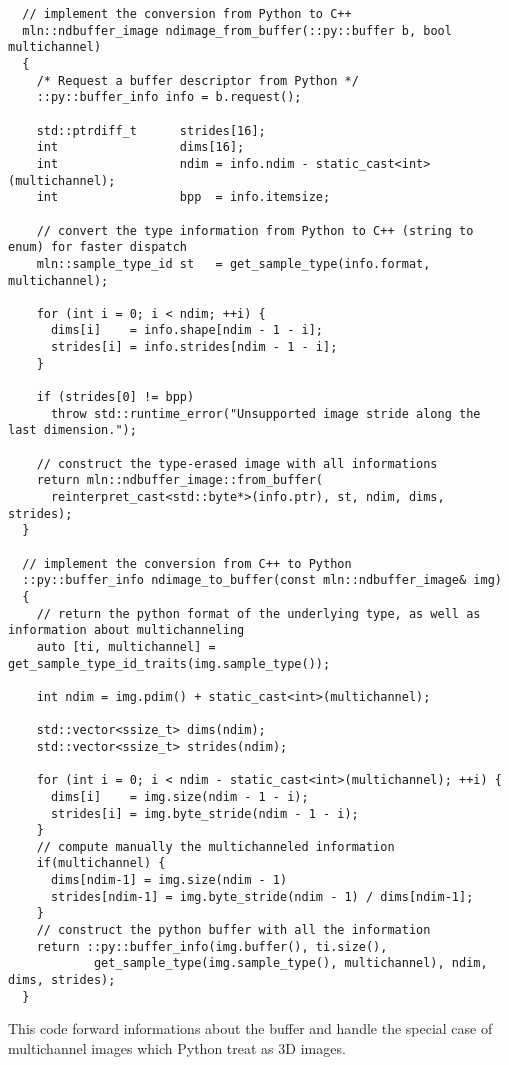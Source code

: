 \begin{verbatim}
  // implement the conversion from Python to C++
  mln::ndbuffer_image ndimage_from_buffer(::py::buffer b, bool multichannel)
  {
    /* Request a buffer descriptor from Python */
    ::py::buffer_info info = b.request();

    std::ptrdiff_t      strides[16];
    int                 dims[16];
    int                 ndim = info.ndim - static_cast<int>(multichannel);
    int                 bpp  = info.itemsize;

    // convert the type information from Python to C++ (string to enum) for faster dispatch
    mln::sample_type_id st   = get_sample_type(info.format, multichannel);

    for (int i = 0; i < ndim; ++i) {
      dims[i]    = info.shape[ndim - 1 - i];
      strides[i] = info.strides[ndim - 1 - i];
    }

    if (strides[0] != bpp)
      throw std::runtime_error("Unsupported image stride along the last dimension.");

    // construct the type-erased image with all informations
    return mln::ndbuffer_image::from_buffer(
      reinterpret_cast<std::byte*>(info.ptr), st, ndim, dims, strides);
  }

  // implement the conversion from C++ to Python
  ::py::buffer_info ndimage_to_buffer(const mln::ndbuffer_image& img)
  {
    // return the python format of the underlying type, as well as information about multichanneling
    auto [ti, multichannel] = get_sample_type_id_traits(img.sample_type());

    int ndim = img.pdim() + static_cast<int>(multichannel);

    std::vector<ssize_t> dims(ndim);
    std::vector<ssize_t> strides(ndim);

    for (int i = 0; i < ndim - static_cast<int>(multichannel); ++i) {
      dims[i]    = img.size(ndim - 1 - i);
      strides[i] = img.byte_stride(ndim - 1 - i);
    }
    // compute manually the multichanneled information
    if(multichannel) {
      dims[ndim-1] = img.size(ndim - 1)
      strides[ndim-1] = img.byte_stride(ndim - 1) / dims[ndim-1];
    }
    // construct the python buffer with all the information
    return ::py::buffer_info(img.buffer(), ti.size(),
            get_sample_type(img.sample_type(), multichannel), ndim, dims, strides);
  }
\end{verbatim}

This code forward informations about the buffer and handle the special case of multichannel images which Python treat
as 3D images.

